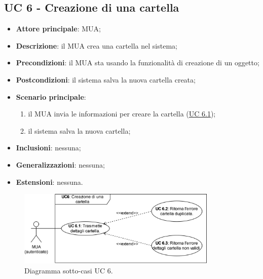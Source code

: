 \subsection{UC 6 - Creazione di una cartella} \label{sec:UC6}
    \begin{itemize}
        \item \textbf{Attore principale}: MUA;
        \item \textbf{Descrizione}: il MUA crea una cartella nel sistema;
        \item \textbf{Precondizioni}: il MUA sta usando la funzionalità di creazione di un oggetto;
        \item \textbf{Postcondizioni}: il sistema salva la nuova cartella creata;
        \item \textbf{Scenario principale}:
            \begin{enumerate}
                \item il MUA invia le informazioni per creare la cartella (\hyperref[sec:UC6.1]{UC 6.1});
                \item il sistema salva la nuova cartella;
            \end{enumerate}
        \item \textbf{Inclusioni}: nessuna;
        \item \textbf{Generalizzazioni}: nessuna;
        \item \textbf{Estensioni}: nessuna.
    \end{itemize}

\begin{figure}[h]
    \includegraphics[width=0.85\textwidth]{sections/uc_imgs/UC06.X.png}
    \centering
    \caption{Diagramma sotto-casi UC 6.}
\end{figure}

